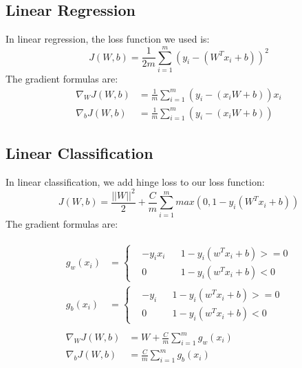 \documentclass[journal, a4paper]{IEEEtran}
\begin{document}
\subsection{Linear Regression}
In linear regression, the loss function we used is:
\begin{equation} \label{eq:linear regression loss function}
    J(W,b) = \frac{1}{2m}\sum_{i=1}^m(y_i-(W^Tx_i+b))^2
\end{equation} 
The gradient formulas are:
\begin{equation} \label{eq:linear regression gradient formula}
    \begin{aligned}
        \nabla_WJ(W,b)&=\frac{1}{m}\sum_{i=1}^m(y_i-(x_iW+b))x_i\\
        \nabla_bJ(W,b)&=\frac{1}{m}\sum_{i=1}^m(y_i-(x_iW+b))
    \end{aligned}
\end{equation}

\subsection{Linear Classification}
In linear classification, we add hinge loss to our loss function:
\begin{equation} \label{eq:linear classification loss function}
    J(W,b) = \frac{||W||^2}2+\frac{C}m\sum_{i=1}^{m}max(0,1-y_i(W^Tx_i+b))
\end{equation}
The gradient formulas are:

\begin{equation} \label{eq:linear classification gradient formula}
    \begin{aligned}
        \begin{aligned}
            g_w(x_i) &= \left\{
                \begin{aligned} 
                    & -y_ix_i & &1-y_i(w^Tx_i+b)>=0 \\
                    & 0 & & 1-y_i(w^Tx_i+b)<0
                \end{aligned}
            \right. \\
            g_b(x_i) &= \left\{
                \begin{aligned} 
                    & -y_i & &1-y_i(w^Tx_i+b)>=0 \\
                    & 0 & & 1-y_i(w^Tx_i+b)<0
                \end{aligned}
            \right. 
        \end{aligned}\\
        \begin{aligned}
            \nabla_WJ(W,b) &= W+\frac{C}m\sum_{i=1}^{m}g_w(x_i)\\
            \nabla_bJ(W,b) &= \frac{C}m\sum_{i=1}^{m}g_b(x_i)
        \end{aligned}
    \end{aligned}
\end{equation}
\end{document}
